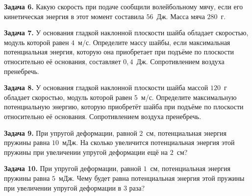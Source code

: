 \begin{taskbasic}[code={\label{task:dem26_v6_n3}}]
\textbf{Задача 6.} Какую скорость при подаче сообщили волейбольному мячу, если его кинетическая энергия в этот момент составила $56$~Дж. Масса мяча $280$~г.

\end{taskbasic}

\begin{taskbasic}[code={\label{task:dem26_v7_n3}}]
\textbf{Задача 7.} У основания гладкой наклонной плоскости шайба обладает скоростью, модуль которой равен $4$~м/с. Определите массу шайбы, если максимальная потенциальная энергия, которую она приобретает при подъёме по плоскости относительно её основания, составляет $0{,}4$~Дж. Сопротивлением воздуха пренебречь.

\end{taskbasic}

\begin{taskbasic}[code={\label{task:dem26_v8_n3}}]
\textbf{Задача 8.} У основания гладкой наклонной плоскости шайба массой $120$~г обладает скоростью, модуль которой равен $5$~м/с. Определите максимальную потенциальную энергию, которую приобретёт шайба при подъёме по плоскости относительно её основания. Сопротивлением воздуха пренебречь.

\end{taskbasic}

\begin{taskbasic}[code={\label{task:dem26_v9_n3}}]
\textbf{Задача 9.} При упругой деформации, равной $2$~см, потенциальная энергия пружины равна $10$~мДж. На сколько увеличится потенциальная энергия этой пружины при увеличении упругой деформации ещё на $2$~см?

\end{taskbasic}

\begin{taskbasic}[code={\label{task:dem26_v10_n3}}]
\textbf{Задача 10.} При упругой деформации, равной $1$~см, потенциальная энергия пружины равна $5$~мДж. Чему будет равна потенциальная энергия этой пружины при увеличении упругой деформации в $3$ раза?

\end{taskbasic}


